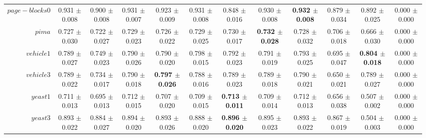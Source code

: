 \begin{table}[!ht]
{\begin{tabular}{r c c c c c c c c c c c}
$page-blocks0$ & 0.931 $\pm$ 0.008 & 0.900 $\pm$ 0.008 & 0.931 $\pm$ 0.007 & 0.923 $\pm$ 0.009 & 0.931 $\pm$ 0.008 & 0.848 $\pm$ 0.016 & 0.930 $\pm$ 0.008 & \textbf{0.932 $\pm$ 0.008} & 0.879 $\pm$ 0.034 & 0.892 $\pm$ 0.025 & 0.000 $\pm$ 0.000 \\
$pima$ & 0.727 $\pm$ 0.030 & 0.722 $\pm$ 0.027 & 0.729 $\pm$ 0.023 & 0.726 $\pm$ 0.022 & 0.729 $\pm$ 0.025 & 0.730 $\pm$ 0.017 & \textbf{0.732 $\pm$ 0.028} & 0.728 $\pm$ 0.032 & 0.706 $\pm$ 0.018 & 0.666 $\pm$ 0.030 & 0.000 $\pm$ 0.000 \\
$vehicle1$ & 0.789 $\pm$ 0.027 & 0.749 $\pm$ 0.023 & 0.790 $\pm$ 0.026 & 0.790 $\pm$ 0.020 & 0.798 $\pm$ 0.015 & 0.792 $\pm$ 0.023 & 0.791 $\pm$ 0.019 & 0.793 $\pm$ 0.025 & 0.695 $\pm$ 0.047 & \textbf{0.804 $\pm$ 0.018} & 0.000 $\pm$ 0.000 \\
$vehicle3$ & 0.789 $\pm$ 0.022 & 0.734 $\pm$ 0.017 & 0.790 $\pm$ 0.018 & \textbf{0.797 $\pm$ 0.026} & 0.788 $\pm$ 0.016 & 0.789 $\pm$ 0.023 & 0.789 $\pm$ 0.018 & 0.790 $\pm$ 0.021 & 0.650 $\pm$ 0.021 & 0.789 $\pm$ 0.027 & 0.000 $\pm$ 0.000 \\
$yeast1$ & 0.711 $\pm$ 0.013 & 0.695 $\pm$ 0.013 & 0.712 $\pm$ 0.015 & 0.707 $\pm$ 0.020 & 0.709 $\pm$ 0.015 & \textbf{0.713 $\pm$ 0.011} & 0.709 $\pm$ 0.014 & 0.712 $\pm$ 0.013 & 0.656 $\pm$ 0.038 & 0.507 $\pm$ 0.002 & 0.000 $\pm$ 0.000 \\
$yeast3$ & 0.893 $\pm$ 0.022 & 0.884 $\pm$ 0.027 & 0.894 $\pm$ 0.020 & 0.893 $\pm$ 0.026 & 0.888 $\pm$ 0.020 & \textbf{0.896 $\pm$ 0.020} & 0.895 $\pm$ 0.023 & 0.893 $\pm$ 0.022 & 0.867 $\pm$ 0.019 & 0.504 $\pm$ 0.003 & 0.000 $\pm$ 0.000 \\
\end{tabular}}
\end{table}
